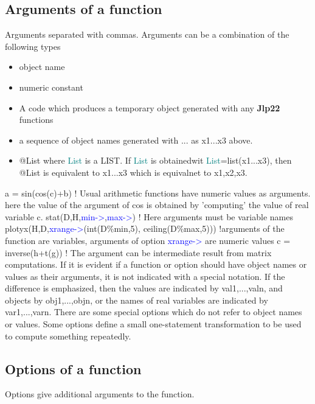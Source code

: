 \subsection{Arguments of a function}
\label{arguments}
Arguments separated with commas. Arguments can be a combination of the following types
\begin{itemize}
\item object name
\item numeric constant
\item A code which produces a temporary object generated with any \textbf{Jlp22} functions
\item a sequence of object names generated with ... as x1...x3 above.
\item @List where \textcolor{teal}{List} is a LIST. If \textcolor{teal}{List} is obtainedwit \textcolor{teal}{List}=\textcolor{VioletRed}{list}(x1...x3), then
@List is equivalent to x1...x3 which is equivalnet to x1,x2,x3.
\end{itemize}
a = \textcolor{VioletRed}{sin}(\textcolor{VioletRed}{cos}(c)+b) ! Usual arithmetic functions have numeric values as arguments.
here the value of the argument of cos is obtained by 'computing' the
value of real variable c.
\textcolor{VioletRed}{stat}(D,H,\textcolor{blue}{min->},\textcolor{blue}{max->}) ! Here arguments must be variable names
\textcolor{VioletRed}{plotyx}(H,D,\textcolor{blue}{xrange->}(\textcolor{VioletRed}{int}(D\%min,5), \textcolor{VioletRed}{ceiling}(D\%max,5))) !arguments of the function are variables, arguments of option \textcolor{blue}{xrange->} are numeric values
c = \textcolor{VioletRed}{inverse}(h+\textcolor{VioletRed}{t}(g)) ! The argument can be intermediate result from matrix computations.
If it is evident if a function or option should have object names or values as their arguments, it
is not indicated with a special notation. If the difference is emphasized, then the values are
indicated by val1,...,valn, and objects by obj1,...,objn, or the names of real variables are
indicated by var1,...,varn.
There are some special options which do not refer to object names or values. Some options
define a small one-statement transformation to be used to compute something repeatedly.

\subsection{Options of a function}
\label{options}
Options give additional arguments to the function.
